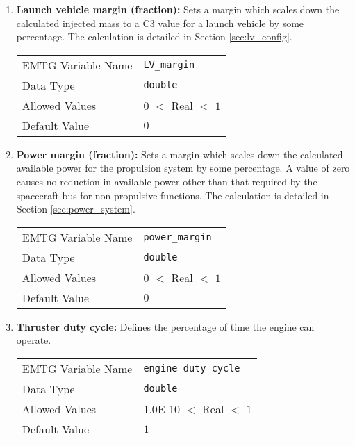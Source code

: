 \begin{enumerate}
    \item \textbf{Launch vehicle margin (fraction):} Sets a margin which scales down the calculated injected mass to a C3 value for a launch vehicle by some percentage. The calculation is detailed in Section \ref{sec:lv_config}.
    \begin{table}[H]
        \hspace{2cm}
        \begin{tabular}{lp{5cm}}
        \ac{EMTG} Variable Name & \verb|LV_margin| \\
        Data Type & \verb|double| \\
        Allowed Values & $0$ $<$ Real $<$ $1$ \\
        Default Value & $0$ \\
        \end{tabular}
    \end{table}
    
    \item \textbf{Power margin (fraction):} Sets a margin which scales down the calculated available power for the propulsion system by some percentage. A value of zero causes no reduction in available power other than that required by the spacecraft bus for non-propulsive functions. The calculation is detailed in Section \ref{sec:power_system}.
    \begin{table}[H]
        \hspace{2cm}
        \begin{tabular}{lp{5cm}}
        \ac{EMTG} Variable Name & \verb|power_margin| \\
        Data Type & \verb|double| \\
        Allowed Values & $0$ $<$ Real $<$ $1$ \\
        Default Value & $0$ \\
        \end{tabular}
    \end{table}
    
    \item \textbf{Thruster duty cycle:} Defines the percentage of time the engine can operate.
    \begin{table}[H]
        \hspace{2cm}
        \begin{tabular}{lp{5cm}}
        \ac{EMTG} Variable Name & \verb|engine_duty_cycle| \\
        Data Type & \verb|double| \\
        Allowed Values & 1.0E-10 $<$ Real $<$ $1$ \\
        Default Value & $1$ \\
        \end{tabular}
    \end{table}
    

\end{enumerate}

